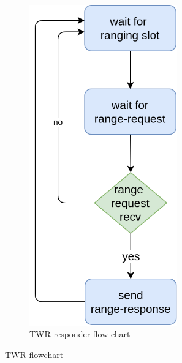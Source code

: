 \documentclass[\main/thesis.tex]{subfiles}
\begin{document}
\begin{figure}[H]
\begin{subfigure}[b]{0.47\textwidth}
\begin{center}
            \includegraphics[width=0.7\textwidth]{twr_responder.png}
        \end{center}
        \caption{TWR responder flow chart}
        \label{fig:twr_responder}
    \end{subfigure}
    \caption{TWR flowchart}
\end{figure}
\end{document}
